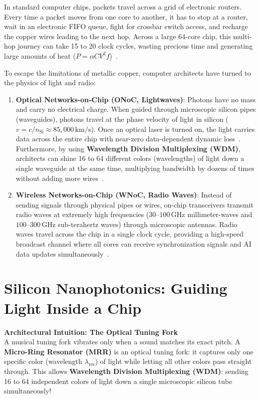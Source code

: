 In standard computer chips, packets travel across a grid of electronic routers. Every time a packet moves from one core to another, it has to stop at a router, wait in an electronic FIFO queue, fight for crossbar switch access, and recharge the copper wires leading to the next hop. Across a large 64-core chip, this multi-hop journey can take 15 to 20 clock cycles, wasting precious time and generating large amounts of heat ($P = \alpha C V^2 f$)~\cite{Borkar1999}.

To escape the limitations of metallic copper, computer architects have turned to the physics of light and radio:

\begin{enumerate}
    \item \textbf{Optical Networks-on-Chip (ONoC, Lightwaves)}: Photons have no mass and carry no electrical charge. When guided through microscopic silicon pipes (waveguides), photons travel at the phase velocity of light in silicon ($v = c / n_{\mathrm{Si}} \approx 85{,}000\,\mathrm{km/s}$). Once an optical laser is turned on, the light carries data across the entire chip with near-zero data-dependent dynamic loss~\cite{Vantrease2008,Kurian2010}. Furthermore, by using \textbf{Wavelength Division Multiplexing (WDM)}, architects can shine 16 to 64 different colors (wavelengths) of light down a single waveguide at the same time, multiplying bandwidth by dozens of times without adding more wires~\cite{Little1997,Kao2026}.
    
    \item \textbf{Wireless Networks-on-Chip (WNoC, Radio Waves)}: Instead of sending signals through physical pipes or wires, on-chip transceivers transmit radio waves at extremely high frequencies ($30\text{--}100\,\mathrm{GHz}$ millimeter-waves and $100\text{--}300\,\mathrm{GHz}$ sub-terahertz waves) through microscopic antennas. Radio waves travel across the chip in a single clock cycle, providing a high-speed broadcast channel where all cores can receive synchronization signals and AI data updates simultaneously~\cite{Deb2012,Abadal2018,Shahmoradi2026}.
\end{enumerate}

\section{Silicon Nanophotonics: Guiding Light Inside a Chip}
\label{sec:nanophotonics-foundations}

\begin{svgraybox}
\textbf{Architectural Intuition: The Optical Tuning Fork} \\
A musical tuning fork vibrates only when a sound matches its exact pitch. A \textbf{Micro-Ring Resonator (MRR)} is an optical tuning fork: it captures only one specific color (wavelength $\lambda_{\mathrm{res}}$) of light while letting all other colors pass straight through. This allows \textbf{Wavelength Division Multiplexing (WDM)}: sending 16 to 64 independent colors of light down a single microscopic silicon tube simultaneously!
\end{svgraybox}

